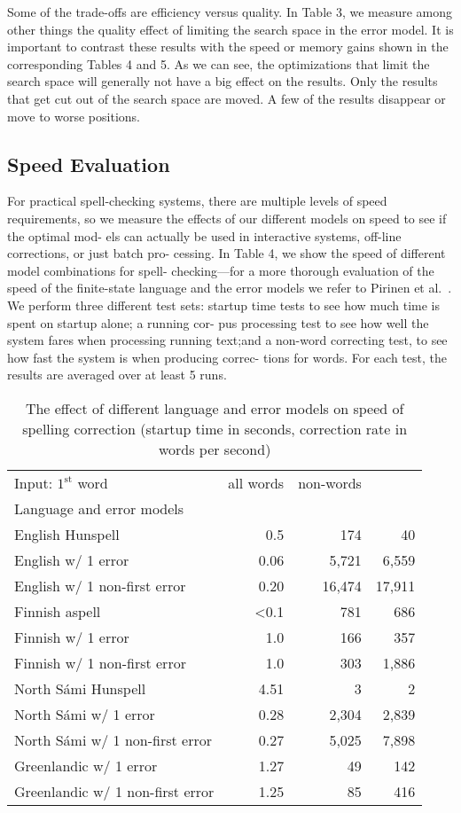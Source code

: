 \documentclass[postprint]{flammie}
\begin{document}
Some of the trade-offs are efficiency versus quality. In Table 3, we measure
among other things the quality effect of limiting the search space in the error
model. It is important to contrast these results with the speed or memory gains
shown in the corresponding Tables 4 and 5. As we can see, the optimizations
that limit the search space will generally not have a big effect on the
results. Only the results that get cut out of the search space are moved. A few
of the results disappear or move to worse positions.

\subsection{Speed Evaluation}

For practical spell-checking systems, there are multiple levels of speed
requirements, so we measure the effects of our different models on speed to see
if the optimal mod- els can actually be used in interactive systems, off-line
corrections, or just batch pro- cessing. In Table 4, we show the speed of
different model combinations for spell- checking—for a more thorough evaluation
of the speed of the finite-state language and the error models we refer to
Pirinen et al.~\cite{pirinen2012effects}. We perform three different test sets:
startup time tests to see how much time is spent on startup alone; a running
cor- pus processing test to see how well the system fares when processing
running text;and a non-word correcting test, to see how fast the system is when
producing correc- tions for words. For each test, the results are averaged over
at least 5 runs.

\begin{table}
    \caption{The effect of different language and error models on speed of spelling correction (startup time in seconds, correction rate in words per second)}
    \begin{tabular}{lrrr}
        Input: $1^{\mathrm{st}}$ word & all words & non-words \\
        Language and error models & & & \\
        English Hunspell & 0.5 & 174 & 40 \\
    English w/ 1 error & 0.06 & 5,721 & 6,559 \\
    English w/ 1 non-first error & 0.20 & 16,474 & 17,911 \\
    Finnish aspell & <0.1 & 781 & 686 \\
    Finnish w/ 1 error & 1.0 & 166 & 357 \\
    Finnish w/ 1 non-first error & 1.0 & 303 & 1,886 \\
    North Sámi Hunspell & 4.51 & 3 & 2 \\
    North Sámi w/ 1 error & 0.28 & 2,304 & 2,839 \\
    North Sámi w/ 1 non-first error & 0.27 & 5,025 & 7,898 \\
    Greenlandic w/ 1 error & 1.27 & 49 & 142 \\
    Greenlandic w/ 1 non-first error & 1.25 & 85 & 416 \\
    \end{tabular}
\end{table}
\end{document}
